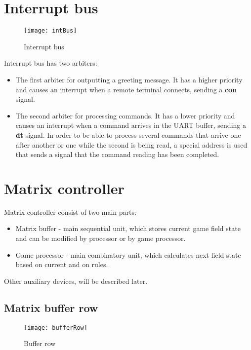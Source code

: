 \section*{Interrupt bus}

\begin{figure}[ht]
	\centering
	\texttt{[image: intBus]}
	\caption{Interrupt bus}
\end{figure}

Interrupt bus has two arbiters:

\begin{itemize}
	\item The first arbiter for outputting a greeting message. It has a higher priority and causes an interrupt when a remote terminal connects, sending a \textbf{con} signal.
	\item The second arbiter for processing commands. It has a lower priority and causes an interrupt when a command arrives in the UART buffer, sending a \textbf{dt} signal. In order to be able to process several commands that arrive one after another or one while the second is being read, a special address is used that sends a signal that the command reading has been completed.
\end{itemize}

\section*{Matrix controller}

Matrix controller consist of two main parts:

\begin{itemize}
	\item Matrix buffer - main sequential unit, which stores current game field state and can be modified by processor or by game processor.
	\item Game processor - main combinatory unit, which calculates next field state based on current and on rules.
\end{itemize}

Other auxiliary devices, will be described later.

\subsection*{Matrix buffer row}

\begin{figure}[ht]
	\centering
	\texttt{[image: bufferRow]}
	\caption{Buffer row}
\end{figure}

